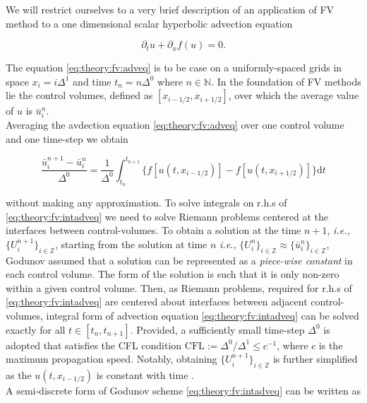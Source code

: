 \documentclass[11pt,a4paper,headinclude=true,DIV=14,BCOR=8mm,chapterprefix,listof=totoc,twoside,openright,abstracton]{scrbook}
\begin{document}
We will restrict ourselves to a very brief description of an application of FV method to a one dimensional scalar hyperbolic advection equation 

\begin{equation}
    \partial_t u + \partial_x f(u) = 0.
    \label{eq:theory:fv:adveq}
\end{equation}

The equation \ref{eq:theory:fv:adveq} is to be case on a uniformly-spaced grids in space $ x_i = i\Delta^1$ and time $t_n = n\Delta^0$ where $n\in\mathbb{N}$. In the foundation of FV methods lie the control volumes, defined as $[x_{i-1/2},x_{i+1/2}]$, over which the average value of $u$ is $\bar{u}_i ^n$. \\
Averaging the avdection equation \ref{eq:theory:fv:adveq} over one control volume and one time-step we obtain

\begin{equation}
    \frac{\bar{u}_{i}^{n+1}-\bar{u}_{i}^{n}}{\Delta^0} = \frac{1}{\Delta^0}\int_{t_n}^{t_{n+1}}\big\{f[u(t,x_{i-1/2})] - f[u(t,x_{i+1/2})]\big\}\text{d}t
    \label{eq:theory:fv:intadveq}
\end{equation}

without making any approximation. To solve integrals on r.h.s of \ref{eq:theory:fv:intadveq} we need to solve Riemann problems centered at the interfaces between control-volumes. To obtain a solution at the time $n+1$, \textit{i.e.,} $\{U_{i}^{n+1}\}_{i\in\mathbb{Z}}$, starting from the solution at time $n$ \textit{i.e.,} $\{U_{i}^{n}\}_{i\in\mathbb{Z}} \approx \{\bar{u}_{i}^{n}\}_{i\in\mathbb{Z}}$, Godunov assumed that a solution can be represented as a \textit{piece-wise constant} in each control volume. The form of the solution is such that it is only non-zero within a given control volume. Then, as Riemann problems, required for r.h.s of \ref{eq:theory:fv:intadveq} are centered about interfaces between adjacent control-volumes, integral form of advection equation \ref{eq:theory:fv:intadveq} can be solved exactly for all $t\in[t_n, t_{n+1}]$. Provided, a sufficiently small time-step $\Delta^0$ is adopted that satisfies the CFL condition $\text{CFL} := \Delta^0 / \Delta^1 \leq c^{-1} $, where $c$ is the maximum propagation speed. Notably, obtaining $\{U^{n+1}_i\}_{i\in\mathbb{Z}}$ is further simplified as the $u(t, x_{i-1/2})$ is constant with time \cite{LeVeque:1992}.\\

A semi-discrete form of Godunov scheme \ref{eq:theory:fv:intadveq} can be written as 
\end{document}
